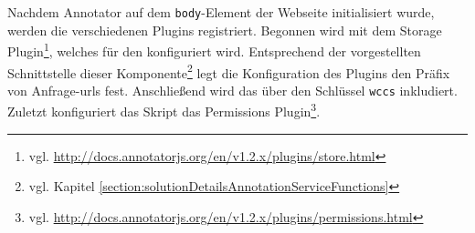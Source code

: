     Nachdem Annotator auf dem \texttt{body}-Element der Webseite initialisiert wurde,
    werden die verschiedenen Plugins registriert.
    Begonnen wird mit dem
    Storage Plugin\footnote{vgl. \url{http://docs.annotatorjs.org/en/v1.2.x/plugins/store.html}},
    welches für den {\annotationService} konfiguriert wird.
    Entsprechend der vorgestellten Schnittstelle dieser
    Komponente\footnote{vgl. Kapitel \ref{section:solutionDetailsAnnotationServiceFunctions}}
    legt die Konfiguration des Plugins den Präfix von Anfrage-\glspl{url} fest.
    Anschließend wird das {\annotatorPlugin} über den Schlüssel \texttt{wccs} inkludiert.
    Zuletzt konfiguriert das Skript das
    Permissions Plugin\footnote{vgl. \url{http://docs.annotatorjs.org/en/v1.2.x/plugins/permissions.html}}.
